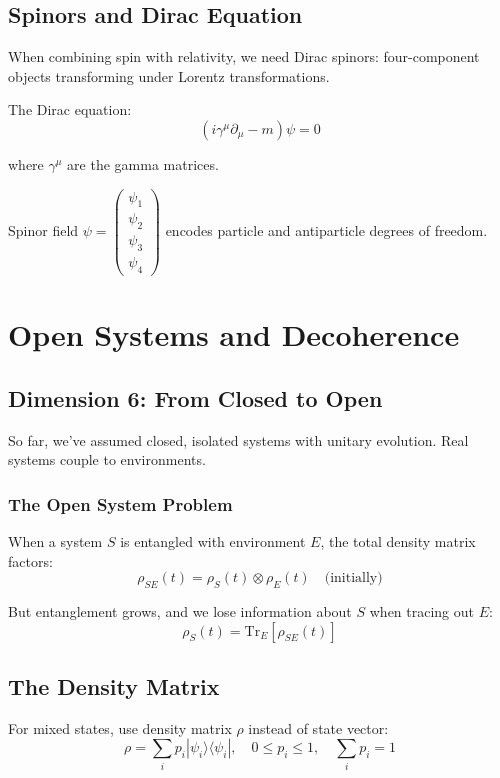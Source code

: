 \documentclass[12pt,openany,oneside]{book}
\newcommand{\ket}[1]{|#1\rangle}
\newcommand{\bra}[1]{\langle #1|}
\begin{document}
{{{\section{Spinors and Dirac Equation}

When combining spin with relativity, we need Dirac spinors: four-component objects transforming under Lorentz transformations.

The Dirac equation:
\[
(i\gamma^\mu \partial_\mu - m)\psi = 0
\]

where $\gamma^\mu$ are the gamma matrices.

Spinor field $\psi = \begin{pmatrix} \psi_1 \\ \psi_2 \\ \psi_3 \\ \psi_4 \end{pmatrix}$ encodes particle and antiparticle degrees of freedom.

\chapter{Open Systems and Decoherence}

\section{Dimension 6: From Closed to Open}

So far, we've assumed closed, isolated systems with unitary evolution. Real systems couple to environments.

\subsection{The Open System Problem}

When a system $S$ is entangled with environment $E$, the total density matrix factors:
\[
\rho_{SE}(t) = \rho_S(t) \otimes \rho_E(t) \quad \text{(initially)}
\]

But entanglement grows, and we lose information about $S$ when tracing out $E$:
\[
\rho_S(t) = \text{Tr}_E[\rho_{SE}(t)]
\]

\section{The Density Matrix}

For mixed states, use density matrix $\rho$ instead of state vector:
\[
\rho = \sum_i p_i \ket{\psi_i}\bra{\psi_i}, \quad 0 \le p_i \le 1, \quad \sum_i p_i = 1
\]

}}}
\end{document}
